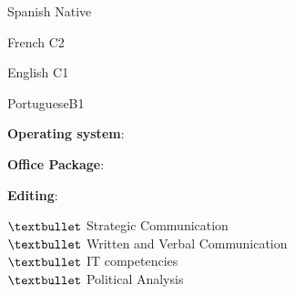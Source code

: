 \begin{skilllist}[7.1][0.7][15.0]

\begin{languagelist}
	\item{Spanish} {Native}	
	\item{French} {C2}	
	\item{English} {C1}	
    \item{Portuguese}{B1}
\end{languagelist}
\vspace{-0.5cm}

\begin{flushleft}
\textbf{Operating system}:  \ponasoftos
\end{flushleft}

\begin{flushleft}
\textbf{Office Package}:  \ponasofttext
\end{flushleft}

\begin{flushleft}
\textbf{Editing}:  \ponasofttool
\end{flushleft}
\vspace{-0.7cm}

	$\textbullet$ Strategic Communication\\
	$\textbullet$ Written and Verbal Communication \\
	$\textbullet$ IT competencies\\
	$\textbullet$ Political Analysis\\
	
	
	
    





\end{skilllist}





